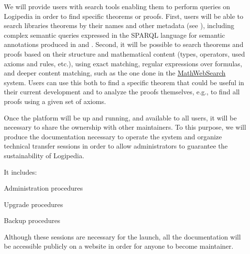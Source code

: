 \begin{workpackage}[id=access,wphases=0-48,type=MGT,
  short=Access,%
  title={Access to the infrastructure},
  lead=Irt,IrtRM=23,OcaRM=6,EduRM=12,InrRM=18]
\begin{tasklist}
  \begin{task}[id=search,
      title=Providing search tools,
      lead=Inr,InrRM=18]
    We will provide users with search tools enabling them to perform
    queries on Logipedia in order to find specific theorems or proofs.
    First, users will be able to search libraries theorems by their
    names and other metadata (see ),
    including complex semantic queries expressed in the SPARQL
    language for semantic annotations produced in
     and
    . Second, it will be possible to
    search theorems and proofs based on their structure and
    mathematical content (types, operators, used axioms and rules,
    etc.), using exact matching, regular expressions over formulas, and
    deeper content matching, such as the one done in the
    \hyperlink{https://kwarc.info/systems/mws/}{MathWebSearch}
    system. Users can use this both to find a specific theorem that
    could be useful in their current development and to analyze the
    proofs themselves, e.g., to find all proofs using a given set of
    axioms. 
  \end{task}

  \begin{task}[id=transfer,
      title=Transfer for the sustainability of the system,
      lead=Irt,IrtRM=1]
    Once the platform will be up and running, and available to all
    users, it will be necessary to share the ownership with other
    maintainers. To this purpose, we will produce the documentation
    necessary to operate the system and organize technical transfer
    sessions in order to allow administrators to guarantee the
    sustainability of Logipedia.

    It includes:
    \begin{compactitem}
    \item Administration procedures
    \item Upgrade procedures
    \item Backup procedures
    \end{compactitem}

    Although these sessions are necessary for the launch, all the
    documentation will be accessible publicly on a website in order
    for anyone to become maintainer.
  \end{task}


\end{tasklist}
\end{workpackage}
